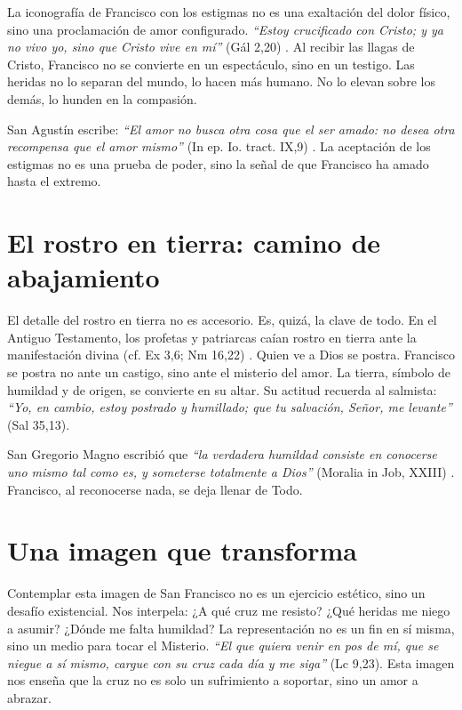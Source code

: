 \documentclass[12pt]{article}
\begin{document}
	La iconografía de Francisco con los estigmas no es una exaltación del dolor físico, sino una proclamación de amor configurado. \textit{“Estoy crucificado con Cristo; y ya no vivo yo, sino que Cristo vive en mí”} (Gál 2,20) \cite{biblia}. Al recibir las llagas de Cristo, Francisco no se convierte en un espectáculo, sino en un testigo. Las heridas no lo separan del mundo, lo hacen más humano. No lo elevan sobre los demás, lo hunden en la compasión.
	
	San Agustín escribe: \textit{“El amor no busca otra cosa que el ser amado: no desea otra recompensa que el amor mismo”} (In ep. Io. tract. IX,9) \cite{agustin}. La aceptación de los estigmas no es una prueba de poder, sino la señal de que Francisco ha amado hasta el extremo.
	
	\section{El rostro en tierra: camino de abajamiento}
	
	El detalle del rostro en tierra no es accesorio. Es, quizá, la clave de todo. En el Antiguo Testamento, los profetas y patriarcas caían rostro en tierra ante la manifestación divina (cf. Ex 3,6; Nm 16,22) \cite{biblia}. Quien ve a Dios se postra. Francisco se postra no ante un castigo, sino ante el misterio del amor. La tierra, símbolo de humildad y de origen, se convierte en su altar. Su actitud recuerda al salmista: \textit{“Yo, en cambio, estoy postrado y humillado; que tu salvación, Señor, me levante”} (Sal 35,13)\cite{biblia}.
	
	San Gregorio Magno escribió que \textit{“la verdadera humildad consiste en conocerse uno mismo tal como es, y someterse totalmente a Dios”} (Moralia in Job, XXIII) \cite{gregorio}. Francisco, al reconocerse nada, se deja llenar de Todo.
	
	\section{Una imagen que transforma}
	
	Contemplar esta imagen de San Francisco no es un ejercicio estético, sino un desafío existencial. Nos interpela: ¿A qué cruz me resisto? ¿Qué heridas me niego a asumir? ¿Dónde me falta humildad? La representación no es un fin en sí misma, sino un medio para tocar el Misterio. \textit{“El que quiera venir en pos de mí, que se niegue a sí mismo, cargue con su cruz cada día y me siga”} (Lc 9,23)\cite{biblia}. Esta imagen nos enseña que la cruz no es solo un sufrimiento a soportar, sino un amor a abrazar.
	
\end{document}

